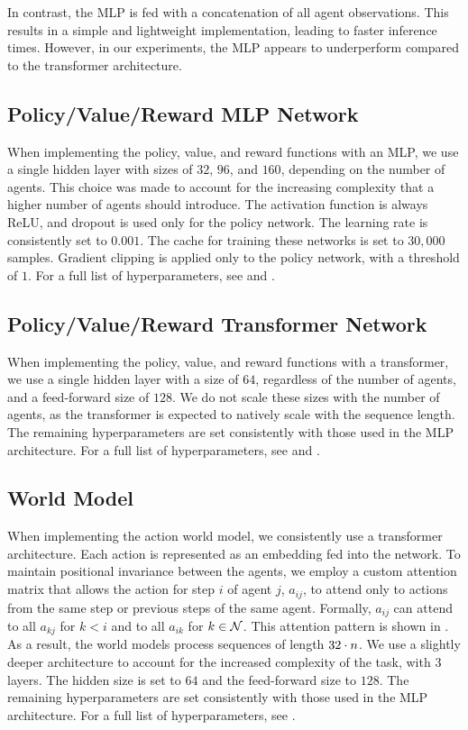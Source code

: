 In contrast, the MLP is fed with a concatenation of all agent observations. This results in a simple and lightweight implementation, leading to faster inference times. However, in our experiments, the MLP appears to underperform compared to the transformer architecture.

\subsection{Policy/Value/Reward MLP Network}
When implementing the policy, value, and reward functions with an MLP, we use a single hidden layer with sizes of $32$, $96$, and $160$, depending on the number of agents. This choice was made to account for the increasing complexity that a higher number of agents should introduce. The activation function is always ReLU, and dropout is used only for the policy network. The learning rate is consistently set to $0.001$. The cache for training these networks is set to $30,000$ samples. Gradient clipping is applied only to the policy network, with a threshold of $1$. For a full list of hyperparameters, see  and .

\subsection{Policy/Value/Reward Transformer Network}
When implementing the policy, value, and reward functions with a transformer, we use a single hidden layer with a size of $64$, regardless of the number of agents, and a feed-forward size of $128$. We do not scale these sizes with the number of agents, as the transformer is expected to natively scale with the sequence length. The remaining hyperparameters are set consistently with those used in the MLP architecture. For a full list of hyperparameters, see  and .


\subsection{World Model}
When implementing the action world model, we consistently use a transformer architecture. Each action is represented as an embedding fed into the network. To maintain positional invariance between the agents, we employ a custom attention matrix that allows the action for step $i$ of agent $j$, $a_{ij}$, to attend only to actions from the same step or previous steps of the same agent. Formally, $a_{ij}$ can attend to all $a_{kj}$ for $k<i$ and to all $a_{ik}$ for $k \in \mathcal{N}$. This attention pattern is shown in . As a result, the world models process sequences of length $32 \cdot n$. We use a slightly deeper architecture to account for the increased complexity of the task, with $3$ layers. The hidden size is set to $64$ and the feed-forward size to $128$. The remaining hyperparameters are set consistently with those used in the MLP architecture. For a full list of hyperparameters, see .

